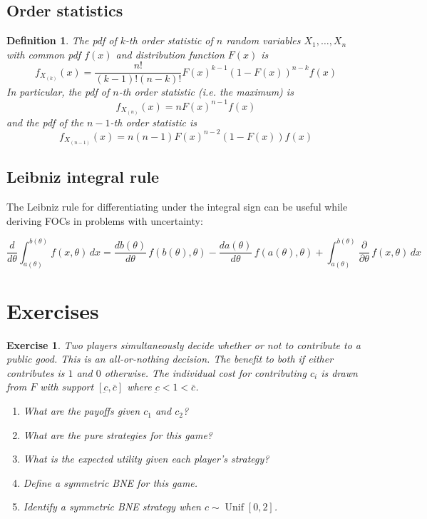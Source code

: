 \documentclass[letter, 11pt]{article}
\theoremstyle{basic}
\newtheorem{exercise}{Exercise}[]
\newtheorem{definition}{Definition}[section]
\begin{document}
\begin{spacing}{1.0}
\subsection{Order statistics}

\begin{definition}
  The pdf of $k$-th order statistic of $n$ random variables $X_1, \ldots, X_n$
  with common pdf $f(x)$ and distribution function $F(x)$ is \[f_{X_{(k)}}(x) =
  \frac{n!}{(k-1)!(n-k)!}F(x)^{k-1}\left(1-F(x)\right)^{n-k} f(x)\] In
  particular, the pdf of $n$-th order statistic (i.e. the maximum)
  is \[f_{X_{(n)}}(x) = n F(x)^{n-1} f(x)\] and the pdf of the $n-1$-th order
  statistic is \[f_{X_{(n-1)}}(x) = n(n-1) F(x)^{n-2} \left(1-F(x)\right) f(x)\]
\end{definition}

\subsection{Leibniz integral rule}

The Leibniz rule for differentiating under the integral sign can be useful while
deriving FOCs in problems with uncertainty:

\[\frac{d}{d\theta}\int_{a(\theta)}^{b(\theta)} f(x,\theta)\,dx = \frac{d b(\theta)}{d \theta}\,f(b(\theta),\theta)-\frac{d a(\theta)}{d \theta}\,f(a(\theta),\theta)+ \int_{a(\theta)}^{b(\theta)}\frac{\partial}{\partial \theta}\,f(x,\theta)\,dx\]

\newpage

\section{Exercises}

\begin{exercise}
  Two players simultaneously decide whether or not to contribute to a public
  good. This is an all-or-nothing decision. The benefit to both if either
  contributes is $1$ and $0$ otherwise. The individual cost for contributing
  $c_i$ is drawn from $F$ with support $[\underbar{c}, \bar{c}]$ where $\underbar{c}
  < 1 < \bar{c}$.
  \begin{enumerate}
  \item What are the payoffs given $c_1$ and $c_2$?
  \item What are the pure strategies for this game?
  \item What is the expected utility given each player's strategy?
  \item Define a symmetric BNE for this game.
  \item Identify a symmetric BNE strategy when $c \sim \operatorname{Unif}[0,2]$.
  \end{enumerate}
\end{exercise}


\end{spacing}
\end{document}
